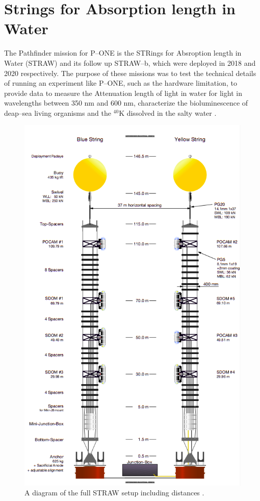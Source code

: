 \section{Strings for Absorption length in Water}

The Pathfinder mission for P--ONE is the STRings for Absroption length in Water (STRAW) and its follow up STRAW--b, which were deployed in 2018 and 2020 respectively. The purpose of these missions was to test the technical details of running an experiment like P--ONE, such as the hardware limitation, to provide data to measure the Attenuation length of light in water for light in wavelengths between 350 nm and 600 nm, characterize the bioluminescence of deap--sea living organisms and the $^{40}$K dissolved in the salty water \cite{straw}.

\begin{figure}[H]
  \centering
  \includegraphics[width=.7\textwidth]{./Figures/STRAW.png}
  \caption{A diagram of the full STRAW setup including distances \cite{straw}.}
  \label{fig:straw}
\end{figure}

